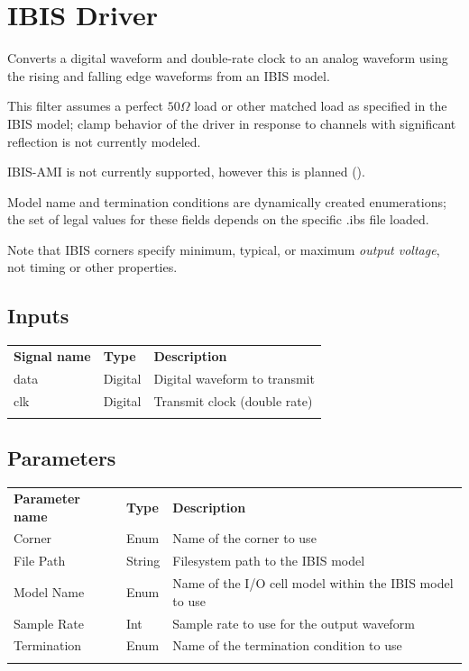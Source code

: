 \section{IBIS Driver}
\label{filter:ibisdriver}

Converts a digital waveform and double-rate clock to an analog waveform using the rising and falling edge waveforms
from an IBIS model.

This filter assumes a perfect $50\Omega$ load or other matched load as specified in the IBIS model; clamp behavior of
the driver in response to channels with significant reflection is not currently modeled.

IBIS-AMI is not currently supported, however this is planned ().

Model name and termination conditions are dynamically created enumerations; the set of legal values for these fields
depends on the specific .ibs file loaded.

Note that IBIS corners specify minimum, typical, or maximum \emph{output voltage}, not timing or other properties.

\subsection{Inputs}

\begin{tabularx}{16cm}{llX}
\thickhline
\textbf{Signal name} & \textbf{Type} & \textbf{Description} \\
\thickhline
data & Digital & Digital waveform to transmit\\
\thinhline
clk & Digital & Transmit clock (double rate)\\
\thickhline
\end{tabularx}

\subsection{Parameters}

\begin{tabularx}{16cm}{llX}
\thickhline
\textbf{Parameter name} & \textbf{Type} & \textbf{Description} \\
\thickhline
Corner & Enum & Name of the corner to use\\
\thinhline
File Path & String & Filesystem path to the IBIS model\\
\thinhline
Model Name & Enum & Name of the I/O cell model within the IBIS model to use\\
\thinhline
Sample Rate & Int & Sample rate to use for the output waveform\\
\thinhline
Termination & Enum & Name of the termination condition to use\\
\thickhline
\end{tabularx}

